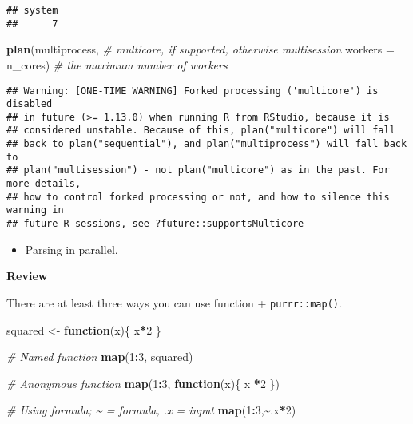 \documentclass[
]{book}
\newenvironment{Shaded}{\begin{snugshade}}{\end{snugshade}}
\newcommand{\CommentTok}[1]{\textcolor[rgb]{0.56,0.35,0.01}{\textit{#1}}}
\newcommand{\ControlFlowTok}[1]{\textcolor[rgb]{0.13,0.29,0.53}{\textbf{#1}}}
\newcommand{\DataTypeTok}[1]{\textcolor[rgb]{0.13,0.29,0.53}{#1}}
\newcommand{\DecValTok}[1]{\textcolor[rgb]{0.00,0.00,0.81}{#1}}
\newcommand{\KeywordTok}[1]{\textcolor[rgb]{0.13,0.29,0.53}{\textbf{#1}}}
\newcommand{\NormalTok}[1]{#1}
\newcommand{\OperatorTok}[1]{\textcolor[rgb]{0.81,0.36,0.00}{\textbf{#1}}}
\newcommand{\StringTok}[1]{\textcolor[rgb]{0.31,0.60,0.02}{#1}}
\providecommand{\tightlist}{%
  \setlength{\itemsep}{0pt}\setlength{\parskip}{0pt}}
\begin{document}
\begin{verbatim}
## system 
##      7
\end{verbatim}

\begin{Shaded}
\begin{Highlighting}[]
\KeywordTok{plan}\NormalTok{(multiprocess, }\CommentTok{\# multicore, if supported, otherwise multisession}
     \DataTypeTok{workers =}\NormalTok{ n\_cores) }\CommentTok{\# the maximum number of workers}
\end{Highlighting}
\end{Shaded}

\begin{verbatim}
## Warning: [ONE-TIME WARNING] Forked processing ('multicore') is disabled
## in future (>= 1.13.0) when running R from RStudio, because it is
## considered unstable. Because of this, plan("multicore") will fall
## back to plan("sequential"), and plan("multiprocess") will fall back to
## plan("multisession") - not plan("multicore") as in the past. For more details,
## how to control forked processing or not, and how to silence this warning in
## future R sessions, see ?future::supportsMulticore
\end{verbatim}

\begin{itemize}
\tightlist
\item
  Parsing in parallel.
\end{itemize}

\textbf{Review}

There are at least three ways you can use function + \texttt{purrr::map()}.

\begin{Shaded}
\begin{Highlighting}[]
\NormalTok{squared \textless{}{-}}\StringTok{ }\ControlFlowTok{function}\NormalTok{(x)\{}
\NormalTok{  x}\OperatorTok{*}\DecValTok{2} 
\NormalTok{\}}

\CommentTok{\# Named function }
\KeywordTok{map}\NormalTok{(}\DecValTok{1}\OperatorTok{:}\DecValTok{3}\NormalTok{, squared)}

\CommentTok{\# Anonymous function }
\KeywordTok{map}\NormalTok{(}\DecValTok{1}\OperatorTok{:}\DecValTok{3}\NormalTok{, }\ControlFlowTok{function}\NormalTok{(x)\{ x }\OperatorTok{*}\DecValTok{2}\NormalTok{ \})}

\CommentTok{\# Using formula; \textasciitilde{} = formula, .x = input }
\KeywordTok{map}\NormalTok{(}\DecValTok{1}\OperatorTok{:}\DecValTok{3}\NormalTok{,}\OperatorTok{\textasciitilde{}}\NormalTok{.x}\OperatorTok{*}\DecValTok{2}\NormalTok{)}
\end{Highlighting}
\end{Shaded}
\end{document}

